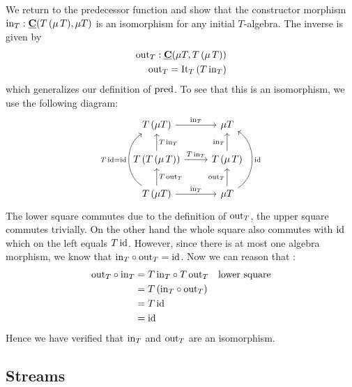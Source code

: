 We return to the predecessor function and show that the constructor morphism $\mathrm{in}_T : \underline{\mathbf{C}}(T\,(\mu\,T),\mu T)$ is an isomorphism for any initial $T$-algebra. The inverse is given by 
\begin{align*}
\mathrm{out}_T : \underline{\mathbf{C}}(\mu T,T\,(\mu\,T)) \\
\mathrm{out}_T = \mathrm{It}_T\,(T\,\mathrm{in}_T)
\end{align*}
which generalizes our definition of $\mathrm{pred}$. To see that this is an isomorphism, we use the following diagram:
\[\begin{tikzcd}
T\,(\mu T) \arrow[r,"\inn_T"] & \mu T\\
T\,(T\,(\mu\,T)) \arrow[r,"T\,\inn_T"]  \arrow[u,"T\,\inn_T" right]& T\,(\mu\,T) \arrow[u,"\inn_T" left]\\
T\,(\mu T) \arrow[u, "T\, \out_T" right]  \arrow[r,"\inn_T"] \arrow[uu,"T\,\id = \id",bend left = 60] & \mu T \arrow[u,"\out_T" left] \arrow[uu,"\id" right, bend right = 60]
\end{tikzcd}\]  
The lower square commutes due to the definition of $\mathrm{out}_T$, the upper square commutes trivially. On the other hand the whole square also commutes with $\mathrm{id}$ which on the left equals $T\,\mathrm{id}$. However, since there is at most one algebra morphism, we know that $\mathrm{in}_T \circ \mathrm{out}_T = \mathrm{id}$. Now we can reason that :
\begin{align*}
  \mathrm{out}_T \circ \mathrm{in}_T & = T\, \mathrm{in}_T \circ T\, \mathrm{out}_T & \mbox{lower square} \\
  & = T\,(\mathrm{in}_T \circ \mathrm{out}_T) \\
  & = T \, \mathrm{id} \\
  & = \mathrm{id}
\end{align*}
Hence we have verified that $\mathrm{in}_T$ and $\mathrm{out}_T$ are an isomorphism.

\subsection{Streams}
\label{sec:terminal-coalgebras}

